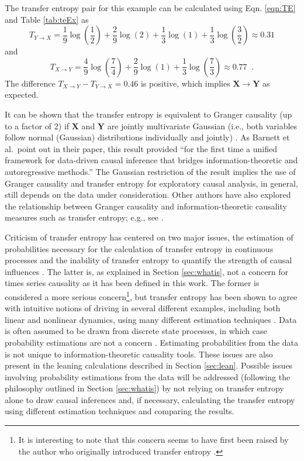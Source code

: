 \documentclass{article}[10pt]
\begin{document}
The transfer entropy pair for this example can be calculated using Eqn. \ref{eqn:TE} and Table \ref{tab:teEx} as
\begin{equation}
T_{Y\rightarrow X} = \frac{1}{9}\log\left(\frac{1}{2}\right)+\frac{2}{9}\log\left(2\right)+\frac{1}{3}\log\left(1\right)+\frac{1}{3}\log\left(\frac{3}{2}\right) \approx 0.31
\end{equation}
and
\begin{equation}
T_{X\rightarrow Y} =  \frac{4}{9}\log\left(\frac{7}{4}\right)+\frac{2}{9}\log\left(1\right)+\frac{1}{3}\log\left(\frac{7}{3}\right) \approx 0.77 \;\;.
\end{equation}
The difference $T_{X\rightarrow Y}-T_{Y\rightarrow X} = 0.46$ is positive, which implies $\mathbf{X}\rightarrow\mathbf{Y}$ as expected.

It can be shown that the transfer entropy is equivalent to Granger causality (up to a factor of 2) if $\mathbf{X}$ and $\mathbf{Y}$ are jointly multivariate Gaussian (i.e., both variables follow normal (Gaussian) distributions individually and jointly) \cite{Barnett2009}.  As Barnett et al.\ point out in their paper, this result provided ``for the first time a unified framework for data-driven causal inference that bridges information-theoretic and autoregressive methods.''  The Gaussian restriction of the result implies the use of Granger causality and transfer entropy for exploratory causal analysis, in general, still depends on the data under consideration.  Other authors have also explored the relationship between Granger causality and information-theoretic causality measures such as transfer entropy; e.g., see \cite{Amblard2012,Lungarella2007}.

Criticism of transfer entropy has centered on two major issues, the estimation of probabilities necessary for the calculation of transfer entropy in continuous processes \cite{Kaiser2002} and the inability of transfer entropy to quantify the strength of causal influences \cite{Janzing2013}.  The latter is, as explained in Section \ref{sec:whatis}, not a concern for times series causality as it has been defined in this work.  The former is considered a more serious concern\footnote{It is interesting to note that this concern seems to have first been raised by the author who originally introduced transfer entropy \cite{Kaiser2002}.}, but transfer entropy has been shown to agree with intuitive notions of driving in several different examples, including both linear and nonlinear dynamics, using many different estimation techniques \cite{Kaiser2002,Nichols2006}.  Data is often assumed to be drawn from discrete state processes, in which case probability estimations are not a concern \cite{Kaiser2002}.  Estimating probabilities from the data is not unique to information-theoretic causality tools.  These issues are also present in the leaning calculations described in Section \ref{sec:lean}.  Possible issues involving probability estimations from the data will be addressed (following the philosophy outlined in Section \ref{sec:whatis}) by not relying on transfer entropy alone to draw causal inferences and, if necessary, calculating the transfer entropy using different estimation techniques and comparing the results.  
\end{document}
